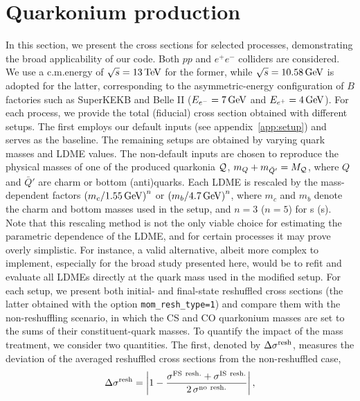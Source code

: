 \section{Quarkonium production}\label{sec:quarkonium}

In this section, we present the cross sections for selected processes, demonstrating the broad applicability of our code. Both $pp$ and $e^+ e^-$ colliders are considered. We use a c.m.\@ energy of $\sqrt{s} = 13\,{\rm TeV}$ for the former, while $\sqrt{s} = 10.58\,{\rm GeV}$ is adopted for the latter, corresponding to the asymmetric-energy configuration of $B$ factories such as SuperKEKB and Belle II ($E_{e^-} = 7\,{\rm GeV}$ and $E_{e^+}=4\,{\rm GeV}$). For each process, we provide the total (fiducial) cross section obtained with different setups. 
The first employs our default inputs (see appendix~\ref{app:setup}) and serves as the baseline.
The remaining setups are obtained by varying quark masses and LDME values. 
The non-default inputs are chosen to reproduce the physical masses of one of the produced quarkonia $\cal Q$, $m_{Q} + m_{\bar{Q}'} = M_{\cal Q}$, where $Q$ and $\bar{Q}'$ are charm or bottom (anti)quarks.
Each LDME is rescaled by the mass-dependent factors {$\left({m_c}/{1.55\,{\rm GeV}}\right)^n$} or {$\left({m_b}/{4.7\,{\rm GeV}}\right)^n$}, where $m_c$ and $m_b$ denote the charm and bottom masses used in the setup, and $n=3$ ($n=5$) for {\swavetxt}s ({\pwavetxt}s).
Note that this rescaling method is not the only viable choice for estimating the parametric dependence of the LDME, and for certain processes it may prove overly simplistic. For instance, a valid alternative, albeit more complex to implement, especially for the broad study presented here, would be to refit and evaluate all LDMEs directly at the quark mass used in the modified setup.
For each setup, we present both initial- and final-state reshuffled cross sections (the latter obtained with the option \texttt{mom\_resh\_type=1}) and compare them with the non-reshuffling scenario, in which the CS and CO quarkonium masses are set to the sums of their constituent-quark masses.
To quantify the impact of the mass treatment, we consider two quantities. The first, denoted by $\Delta\sigma^{\rm resh}$, measures the deviation of the averaged reshuffled cross sections from the non-reshuffled case,
\begin{equation}
    \Delta\sigma^{\rm resh} = \left\vert 1 - \frac{\sigma^{\rm FS\ resh.} + \sigma^{\rm IS\ resh.}}{2\,\sigma^{\rm no\ resh.}} \right\vert,
\end{equation}
